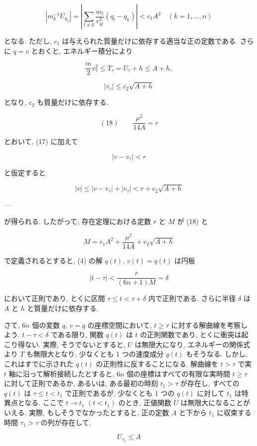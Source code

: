 \documentclass[dvipdfmx, leqno]{jsbook}
\begin{document}
$$|m_k^{-1} U_{q_k}| = \left| \sum_{l \neq k} \frac{m_l}{r_{kl}^3} (q_l - q_k) \right| < c_1 A^2 \quad (k=1,\dots,n)$$

となる. ただし, $c_1$ は与えられた質量だけに依存する適当な正の定数である. さらに $\dot{q} = v$ とおくと, エネルギー積分により

$$\frac{m}{2} v_\tau^2 \leq T_\tau = U_\tau + h \leq A + h,$$

$$|v_\tau| \leq c_2 \sqrt{A + h}$$

となり, $c_2$ も質量だけに依存する.

$$(18) \qquad \frac{\mu^2}{14A} = r$$

とおいて, (17) に加えて

$$|v - v_\tau| < r$$

と仮定すると

$$|v| \leq |v - v_\tau| + |v_\tau| < r + c_2 \sqrt{A + h}$$

---


が得られる. したがって, 存在定理における定数 $r$ と $M$ が (18) と

$$M = c_1 A^2 + \frac{\mu^2}{14A} + c_2 \sqrt{A + h}$$

で定義されるとすると, (4) の解 $q(t), \, v(t) = \dot{q}(t)$ は円板

$$|t - \tau| < \frac{r}{(6n+1)M} = \delta$$

において正則であり, とくに区間 $\tau \leq t < \tau + \delta$ 内で正則である. さらに半径 $\delta$ は $A$ と $h$ と質量だけに依存する.

さて, $6n$ 個の変数 $q, \, v = \dot{q}$ の座標空間において, $t \geq \tau$ に対する解曲線を考察しよう. $t - \tau < \delta$ である限り, 関数 $q(t)$ は $t$ の正則関数であり, とくに衝突は起こり得ない. 実際, そうでないとすると, $U$ は無限大になり, エネルギーの関係式より $T$ も無限大となり, 少なくとも 1 つの速度成分 $\dot{q}(t)$ もそうなる. しかし, これはすでに示された $q(t)$ の正則性に反することになる. 解曲線を $t > \tau$ で実 $t$ 軸に沿って解析接続したとすると, $6n$ 個の座標はすべての有限な実時間 $t \geq \tau$ に対して正則であるか, あるいは, ある最初の時刻 $t_1 > \tau$ が存在し, すべての $q(t)$ は $\tau \leq t < t_1$ で正則であるが, 少なくとも 1 つの $q(t)$ に対して $t_1$ は特異点となる. ここで $t \to t_1$ $(t < t_1)$ のとき, 正値関数 $U$ は無限大になることがいえる. 実際, もしそうでなかったとすると, 正の定数 $A$ と下から $t_1$ に収束する時間 $\tau_1 > \tau$ の列が存在して,

$$U_{\tau_1} \leq A$$
\end{document}
